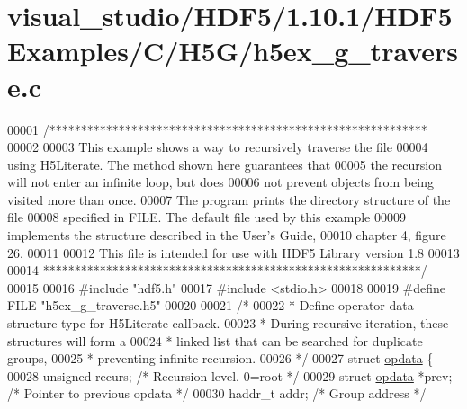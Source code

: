 \hypertarget{visual__studio_2_h_d_f5_21_810_81_2_h_d_f5_examples_2_c_2_h5_g_2h5ex__g__traverse_8c_source}{}\section{visual\+\_\+studio/\+H\+D\+F5/1.10.1/\+H\+D\+F5\+Examples/\+C/\+H5\+G/h5ex\+\_\+g\+\_\+traverse.c}
\label{visual__studio_2_h_d_f5_21_810_81_2_h_d_f5_examples_2_c_2_h5_g_2h5ex__g__traverse_8c_source}

\begin{DoxyCode}
00001 \textcolor{comment}{/************************************************************}
00002 \textcolor{comment}{}
00003 \textcolor{comment}{  This example shows a way to recursively traverse the file}
00004 \textcolor{comment}{  using H5Literate.  The method shown here guarantees that}
00005 \textcolor{comment}{  the recursion will not enter an infinite loop, but does}
00006 \textcolor{comment}{  not prevent objects from being visited more than once.}
00007 \textcolor{comment}{  The program prints the directory structure of the file}
00008 \textcolor{comment}{  specified in FILE.  The default file used by this example}
00009 \textcolor{comment}{  implements the structure described in the User's Guide,}
00010 \textcolor{comment}{  chapter 4, figure 26.}
00011 \textcolor{comment}{}
00012 \textcolor{comment}{  This file is intended for use with HDF5 Library version 1.8}
00013 \textcolor{comment}{}
00014 \textcolor{comment}{ ************************************************************/}
00015 
00016 \textcolor{preprocessor}{#include "hdf5.h"}
00017 \textcolor{preprocessor}{#include <stdio.h>}
00018 
00019 \textcolor{preprocessor}{#define FILE       "h5ex\_g\_traverse.h5"}
00020 
00021 \textcolor{comment}{/*}
00022 \textcolor{comment}{ * Define operator data structure type for H5Literate callback.}
00023 \textcolor{comment}{ * During recursive iteration, these structures will form a}
00024 \textcolor{comment}{ * linked list that can be searched for duplicate groups,}
00025 \textcolor{comment}{ * preventing infinite recursion.}
00026 \textcolor{comment}{ */}
00027 \textcolor{keyword}{struct }\hyperlink{structopdata}{opdata} \{
00028     \textcolor{keywordtype}{unsigned}        recurs;         \textcolor{comment}{/* Recursion level.  0=root */}
00029     \textcolor{keyword}{struct }\hyperlink{structopdata}{opdata}   *prev;          \textcolor{comment}{/* Pointer to previous opdata */}
00030     haddr\_t         addr;           \textcolor{comment}{/* Group address */}

\end{DoxyCode}
